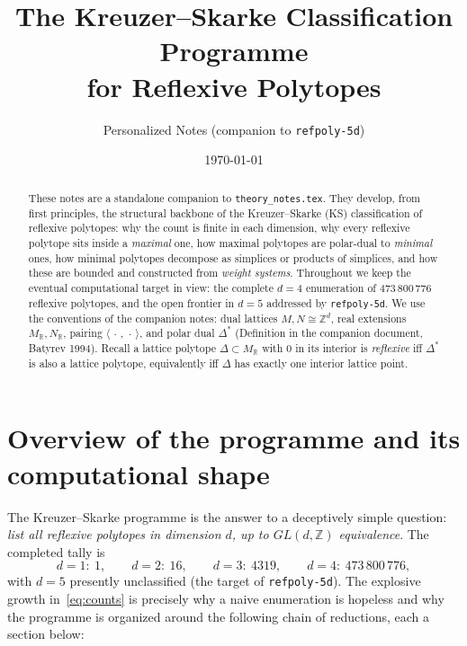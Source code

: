 \documentclass{amsart}
\title{The Kreuzer--Skarke Classification Programme \\
       for Reflexive Polytopes}
\author{Personalized Notes (companion to \texttt{refpoly-5d})}
\date{\today}
\begin{document}
\begin{abstract}
These notes are a standalone companion to \texttt{theory\_notes.tex}. They
develop, from first principles, the structural backbone of the
Kreuzer--Skarke (KS) classification of reflexive polytopes: why the count
is finite in each dimension, why every reflexive polytope sits inside a
\emph{maximal} one, how maximal polytopes are polar-dual to \emph{minimal}
ones, how minimal polytopes decompose as simplices or products of
simplices, and how these are bounded and constructed from \emph{weight
systems}. Throughout we keep the eventual computational target in view:
the complete $d=4$ enumeration of $473\,800\,776$ reflexive polytopes, and
the open frontier in $d=5$ addressed by \texttt{refpoly-5d}.
We use the conventions of the companion notes: dual lattices
$M,N \cong \mathbb{Z}^d$, real extensions $M_{\mathbb{R}},N_{\mathbb{R}}$,
pairing $\langle\,\cdot\,,\,\cdot\,\rangle$, and polar dual $\Delta^*$
(Definition in the companion document, Batyrev 1994). Recall a lattice
polytope $\Delta \subset M_{\mathbb{R}}$ with $0$ in its interior is
\emph{reflexive} iff $\Delta^*$ is also a lattice polytope, equivalently iff
$\Delta$ has exactly one interior lattice point.
\end{abstract}

\maketitle
\tableofcontents

\section{Overview of the programme and its computational shape}

The Kreuzer--Skarke programme is the answer to a deceptively simple
question: \emph{list all reflexive polytopes in dimension $d$, up to
$GL(d,\mathbb{Z})$ equivalence}. The completed tally is
\begin{equation}\label{eq:counts}
  d=1:\ 1, \qquad d=2:\ 16, \qquad d=3:\ 4319,
  \qquad d=4:\ 473\,800\,776,
\end{equation}
with $d=5$ presently unclassified (the target of \texttt{refpoly-5d}).
The explosive growth in~\eqref{eq:counts} is precisely why a naive
enumeration is hopeless and why the programme is organized around the
following chain of reductions, each a section below:
\end{document}
